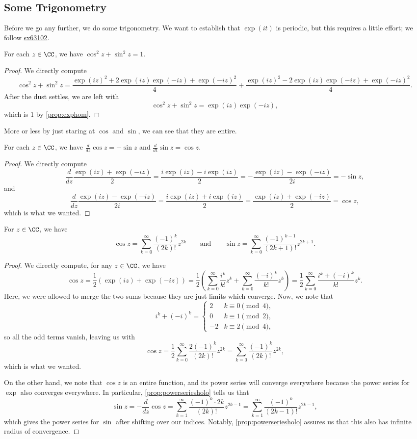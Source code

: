 \subsection{Some Trigonometry}
Before we go any further, we do some trigonometry. We want to establish that $\exp(it)$ is periodic, but this requires a little effort; we follow \href{https://math.stackexchange.com/a/63109/869257}{sx63102}.
\begin{lemma} \label{lem:sumsquares}
	For each $z\in\CC$, we have $\cos^2z+\sin^2z=1$.
\end{lemma}
\begin{proof}
	We directly compute
	\[\cos^2z+\sin^2z=\frac{\exp(iz)^2+2\exp(iz)\exp(-iz)+\exp(-iz)^2}{4}+\frac{\exp(iz)^2-2\exp(iz)\exp(-iz)+\exp(-iz)^2}{-4}.\]
	After the dust settles, we are left with
	\[\cos^2z+\sin^2z=\exp(iz)\exp(-iz),\]
	which is $1$ by \autoref{prop:exphom}.
\end{proof}
More or less by just staring at $\cos$ and $\sin$, we can see that they are entire.
\begin{lemma} \label{lem:trigderivs}
	For each $z\in\CC$, we have $\frac d{dz}\cos z=-\sin z$ and $\frac d{dt}\sin z=\cos z$.
\end{lemma}
\begin{proof}
	We directly compute
	\[\frac d{dz}\frac{\exp(iz)+\exp(-iz)}2=\frac{i\exp(iz)-i\exp(iz)}2=-\frac{\exp(iz)-\exp(-iz)}{2i}=-\sin z,\]
	and
	\[\frac d{dz}\frac{\exp(iz)-\exp(-iz)}{2i}=\frac{i\exp(iz)+i\exp(iz)}2=\frac{\exp(iz)+\exp(-iz)}{2}=\cos z,\]
	which is what we wanted.
\end{proof}
\begin{lemma}
	For $z\in\CC$, we have
	\[\cos z=\sum_{k=0}^\infty\frac{(-1)^k}{(2k)!}z^{2k}\qquad\text{and}\qquad\sin z=\sum_{k=0}^\infty\frac{(-1)^{k-1}}{(2k+1)!}z^{2k+1}.\]
\end{lemma}
\begin{proof}
	We directly compute, for any $z\in\CC$, we have
	\[\cos z=\frac12(\exp(iz)+\exp(-iz))=\frac12\left(\sum_{k=0}^\infty\frac{i^k}{k!}z^k+\sum_{k=0}^\infty\frac{(-i)^k}{k!}z^k\right)=\frac12\sum_{k=0}^\infty\frac{i^k+(-i)^k}{k!}z^k.\]
	Here, we were allowed to merge the two sums because they are just limits which converge. Now, we note that
	\[i^k+(-i)^k=\begin{cases}
		2 & k\equiv0\pmod4, \\
		0 & k\equiv1\pmod2, \\
		-2 & k\equiv2\pmod4,
	\end{cases}\]
	so all the odd terms vanish, leaving us with
	\[\cos z=\frac12\sum_{k=0}^\infty\frac{2(-1)^k}{(2k)!}z^{2k}=\sum_{k=0}^\infty\frac{(-1)^k}{(2k)!}z^{2k},\]
	which is what we wanted.

	On the other hand, we note that $\cos z$ is an entire function, and its power series will converge everywhere because the power series for $\exp$ also converges everywhere. In particular, \autoref{prop:powerseriesholo} tells us that
	\[\sin z=-\frac d{dz}\cos z=\sum_{k=1}^\infty\frac{(-1)^k\cdot2k}{(2k)!}z^{2k-1}=\sum_{k=1}^\infty\frac{(-1)^k}{(2k-1)!}z^{2k-1},\]
	which gives the power series for $\sin$ after shifting over our indices. Notably, \autoref{prop:powerseriesholo} assures us that this also has infinite radius of convergence.
\end{proof}
